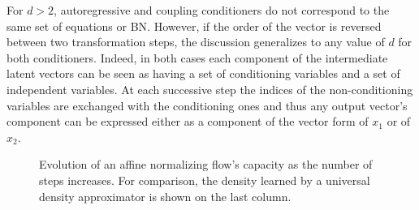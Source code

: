 For $d > 2$, autoregressive and coupling conditioners do not correspond to the same set of equations or BN. However, if the order of the vector is reversed between two transformation steps, the discussion generalizes to any value of $d$ for both conditioners. Indeed, in both cases each component of the intermediate latent vectors can be seen as having a set of conditioning variables and a set of independent variables. At each successive step the indices of the non-conditioning variables are exchanged with the conditioning ones and thus any output vector's component can be expressed either as a component of the vector form of $x_1$ or of $x_2$.

\begin{figure}
    \def\layersep{2.5cm}
    \centering
\hspace{-1.5em}
    \caption{Evolution of an affine normalizing flow's capacity as the number of steps increases. For comparison, the density learned by a universal density approximator is shown on the last column.}
    \label{fig:BN-steps}
    \vspace{-1.em}

\end{figure}
